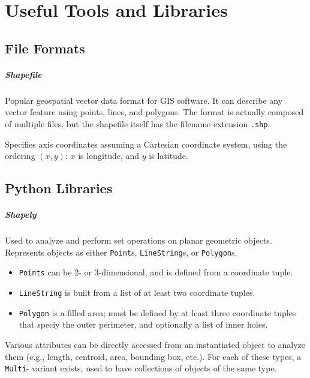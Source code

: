 \titleformat{\paragraph}[runin]{\normalfont\normalsize\bfseries\color{Maroon}}{}{0em}{}

\chapter{Useful Tools and Libraries}

\section{File Formats}
\paragraph{Shapefile}
Popular geospatial vector data format for GIS software. It can describe any vector feature using points, lines, and polygons. The format is actually composed of multiple files, but the shapefile itself has the filename extension \texttt{.shp}.

Specifies axis coordinates assuming a Cartesian coordinate system, using the ordering $(x,y)$: $x$ is longitude, and $y$ is latitude.

\section{Python Libraries}
\paragraph{Shapely}
Used to analyze and perform set operations on planar geometric objects. Represents objects as either \texttt{Point}s, \texttt{LineString}s, or \texttt{Polygon}s.
\begin{itemize}[itemsep=-5pt, label=-]
    \item \texttt{Points} can be 2- or 3-dimensional, and is defined from a coordinate tuple.
    \item \texttt{LineString} is built from a list of at least two coordinate tuples.
    \item \texttt{Polygon} is a filled area; must be defined by at least three coordinate tuples that speciy the outer perimeter, and optionally a list of inner holes.
\end{itemize}
Various attributes can be directly accessed from an instantiated object to analyze them (e.g., length, centroid, area, bounding box, etc.). For each of these types, a \texttt{Multi}- variant exists, used to have collections of objects of the same type.

